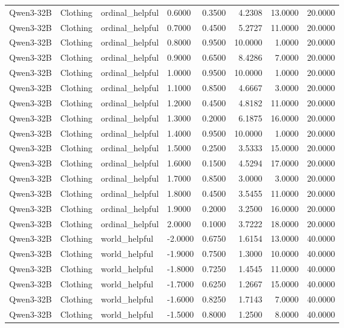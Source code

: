 \begin{table}
\begin{tabular}{llllrrrr}
Qwen3-32B & Clothing & ordinal_helpful & 0.6000 & 0.3500 & 4.2308 & 13.0000 & 20.0000 \\
Qwen3-32B & Clothing & ordinal_helpful & 0.7000 & 0.4500 & 5.2727 & 11.0000 & 20.0000 \\
Qwen3-32B & Clothing & ordinal_helpful & 0.8000 & 0.9500 & 10.0000 & 1.0000 & 20.0000 \\
Qwen3-32B & Clothing & ordinal_helpful & 0.9000 & 0.6500 & 8.4286 & 7.0000 & 20.0000 \\
Qwen3-32B & Clothing & ordinal_helpful & 1.0000 & 0.9500 & 10.0000 & 1.0000 & 20.0000 \\
Qwen3-32B & Clothing & ordinal_helpful & 1.1000 & 0.8500 & 4.6667 & 3.0000 & 20.0000 \\
Qwen3-32B & Clothing & ordinal_helpful & 1.2000 & 0.4500 & 4.8182 & 11.0000 & 20.0000 \\
Qwen3-32B & Clothing & ordinal_helpful & 1.3000 & 0.2000 & 6.1875 & 16.0000 & 20.0000 \\
Qwen3-32B & Clothing & ordinal_helpful & 1.4000 & 0.9500 & 10.0000 & 1.0000 & 20.0000 \\
Qwen3-32B & Clothing & ordinal_helpful & 1.5000 & 0.2500 & 3.5333 & 15.0000 & 20.0000 \\
Qwen3-32B & Clothing & ordinal_helpful & 1.6000 & 0.1500 & 4.5294 & 17.0000 & 20.0000 \\
Qwen3-32B & Clothing & ordinal_helpful & 1.7000 & 0.8500 & 3.0000 & 3.0000 & 20.0000 \\
Qwen3-32B & Clothing & ordinal_helpful & 1.8000 & 0.4500 & 3.5455 & 11.0000 & 20.0000 \\
Qwen3-32B & Clothing & ordinal_helpful & 1.9000 & 0.2000 & 3.2500 & 16.0000 & 20.0000 \\
Qwen3-32B & Clothing & ordinal_helpful & 2.0000 & 0.1000 & 3.7222 & 18.0000 & 20.0000 \\
Qwen3-32B & Clothing & world_helpful & -2.0000 & 0.6750 & 1.6154 & 13.0000 & 40.0000 \\
Qwen3-32B & Clothing & world_helpful & -1.9000 & 0.7500 & 1.3000 & 10.0000 & 40.0000 \\
Qwen3-32B & Clothing & world_helpful & -1.8000 & 0.7250 & 1.4545 & 11.0000 & 40.0000 \\
Qwen3-32B & Clothing & world_helpful & -1.7000 & 0.6250 & 1.2667 & 15.0000 & 40.0000 \\
Qwen3-32B & Clothing & world_helpful & -1.6000 & 0.8250 & 1.7143 & 7.0000 & 40.0000 \\
Qwen3-32B & Clothing & world_helpful & -1.5000 & 0.8000 & 1.2500 & 8.0000 & 40.0000 \\

\end{tabular}
\end{table}

